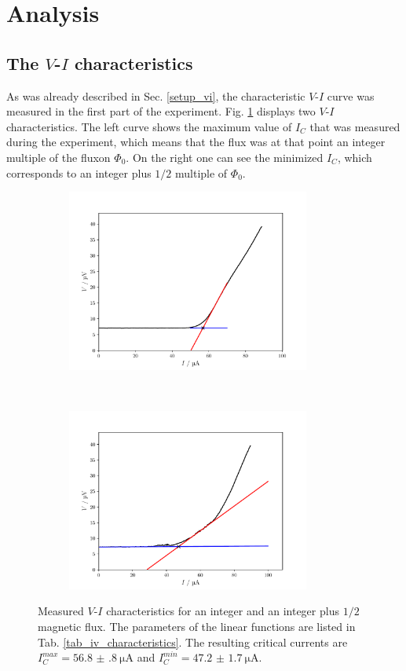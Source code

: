 \documentclass[a4paper,10pt]{article}
\begin{document}
\section{Analysis}
\subsection{The $V$-$I$ characteristics}
As was already described in Sec. \ref{setup_vi}, the characteristic $V$-$I$ curve was measured in the first part of the experiment. Fig. \ref{fig_iv_characteristics} displays two $V$-$I$ characteristics. The left curve shows the maximum value of $I_C$ that was measured during the experiment, which means that the flux was at that point an integer multiple of the fluxon $\Phi_0$. On the right one can see the minimized $I_C$, which corresponds to an integer plus $1/2$ multiple of $\Phi_0$. 
\begin{figure}[htp!]
    \centering
    \begin{subfigure}[t]{0.45 \textwidth}
        \centering
        \includegraphics[height=6cm]{iv_max.pdf}
        \caption{ }
    \end{subfigure}
    ~ 
    \begin{subfigure}[t]{0.45 \textwidth}
        \centering
        \includegraphics[height=6cm]{iv_min.pdf}
        \caption{ }
    \end{subfigure}
    \caption{Measured $V$-$I$ characteristics for an integer and an integer plus $1/2$ magnetic flux. The parameters of the linear functions are listed in Tab. \ref{tab_iv_characteristics}. The resulting critical currents are $I_C^{max} = \SI{56.8(8)}{\micro \ampere}$ and $I_C^{min} = \SI{47.2(17)}{\micro \ampere}$. }
    \label{fig_iv_characteristics}
\end{figure}
\end{document}
